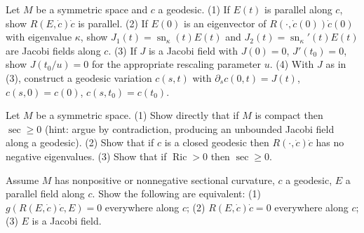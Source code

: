 \begin{remark}
  \label{rem:pet-ch10-exercise-jacobi-fields-eigenvector}
  Let $M$ be a symmetric space and $c$ a geodesic. (1) If $E(t)$ is parallel
  along $c$, show $R(E,\dot c)\dot c$ is parallel. (2) If $E(0)$ is an eigenvector
  of $R(\cdot,\dot c(0))\dot c(0)$ with eigenvalue $\kappa$, show
  $J_1(t)=\operatorname{sn}_\kappa(t)E(t)$ and $J_2(t)=\operatorname{sn}_\kappa'(t)E(t)$ are Jacobi
  fields along $c$. (3) If $J$ is a Jacobi field with $J(0)=0$, $J'(t_0)=0$, show
  $J(t_0/u)=0$ for the appropriate rescaling parameter $u$. (4) With $J$ as in
  (3), construct a geodesic variation $c(s,t)$ with $\partial_sc(0,t)=J(t)$,
  $c(s,0)=c(0)$, $c(s,t_0)=c(t_0)$.
\end{remark}

\begin{remark}
  \label{rem:pet-ch10-exercise-compact-nonneg-curvature}
  Let $M$ be a symmetric space. (1) Show directly that if $M$ is compact then
  $\sec\ge0$ (hint: argue by contradiction, producing an unbounded Jacobi field
  along a geodesic). (2) Show that if $c$ is a closed geodesic then
  $R(\cdot,\dot c)\dot c$ has no negative eigenvalues. (3) Show that if
  $\operatorname{Ric}>0$ then $\sec\ge0$.
\end{remark}

\begin{remark}
  \label{rem:pet-ch10-exercise-jacobi-field-equivalence}
  Assume $M$ has nonpositive or nonnegative sectional curvature, $c$ a geodesic,
  $E$ a parallel field along $c$. Show the following are equivalent: (1)
  $g(R(E,\dot c)\dot c,E)=0$ everywhere along $c$; (2) $R(E,\dot c)\dot c=0$
  everywhere along $c$; (3) $E$ is a Jacobi field.
\end{remark}

